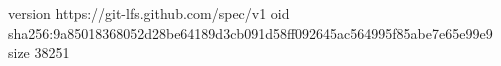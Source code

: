 version https://git-lfs.github.com/spec/v1
oid sha256:9a85018368052d28be64189d3cb091d58ff092645ac564995f85abe7e65e99e9
size 38251
